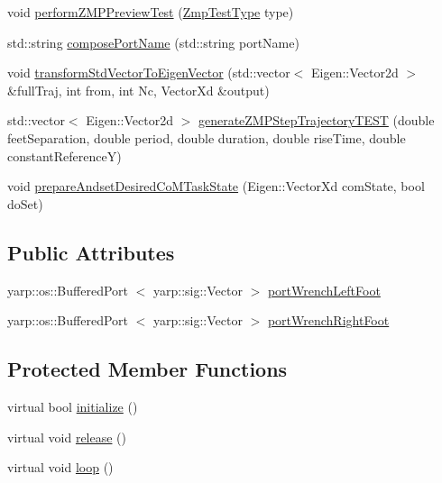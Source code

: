 \begin{DoxyCompactItemize}
\item 
void \hyperlink{classWalkingClient_a3b1217b7fa17f76f162be0e12e419d96}{perform\-Z\-M\-P\-Preview\-Test} (\hyperlink{WalkingClient_8h_afc01479a47f5a87462a54b6a9e11fffa}{\-Zmp\-Test\-Type} type)
\item 
std\-::string \hyperlink{classWalkingClient_ae8f7dc629313df7d362e3edd6f45ae10}{compose\-Port\-Name} (std\-::string port\-Name)
\item 
void \hyperlink{classWalkingClient_ab4148804702e065310a903112bc10162}{transform\-Std\-Vector\-To\-Eigen\-Vector} (std\-::vector$<$ \-Eigen\-::\-Vector2d $>$ \&full\-Traj, int from, int \-Nc, \-Vector\-Xd \&output)
\item 
std\-::vector$<$ \-Eigen\-::\-Vector2d $>$ \hyperlink{classWalkingClient_a70b2375134ae55a041fbf30180ea3a8f}{generate\-Z\-M\-P\-Step\-Trajectory\-T\-E\-S\-T} (double feet\-Separation, double period, double duration, double rise\-Time, double constant\-Reference\-Y)
\item 
void \hyperlink{classWalkingClient_aad39a3836319f9b7258d8eb129776b47}{prepare\-Andset\-Desired\-Co\-M\-Task\-State} (\-Eigen\-::\-Vector\-Xd com\-State, bool do\-Set)
\end{DoxyCompactItemize}
\subsection*{\-Public \-Attributes}
\begin{DoxyCompactItemize}
\item 
yarp\-::os\-::\-Buffered\-Port\*
$<$ yarp\-::sig\-::\-Vector $>$ \hyperlink{classWalkingClient_a88ee63ff6a341eccd458d24700383457}{port\-Wrench\-Left\-Foot}
\item 
yarp\-::os\-::\-Buffered\-Port\*
$<$ yarp\-::sig\-::\-Vector $>$ \hyperlink{classWalkingClient_a96321dc60e84c193f2dea6e85983ca67}{port\-Wrench\-Right\-Foot}
\end{DoxyCompactItemize}
\subsection*{\-Protected \-Member \-Functions}
\begin{DoxyCompactItemize}
\item 
virtual bool \hyperlink{classWalkingClient_aba6a03fe29a4e947bc6bc0c09a713b2a}{initialize} ()
\item 
virtual void \hyperlink{classWalkingClient_a3b36da9d7649865a13c9318dd73ebc7e}{release} ()
\item 
virtual void \hyperlink{classWalkingClient_afd997bb00534c57fe1b0d5f37f207386}{loop} ()
\end{DoxyCompactItemize}
